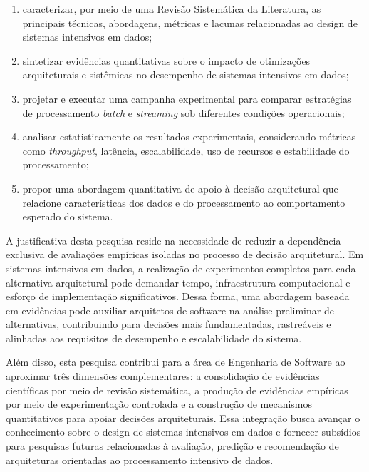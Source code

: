 \begin{enumerate}
\item caracterizar, por meio de uma Revisão Sistemática da Literatura, as principais técnicas, abordagens, métricas e lacunas relacionadas ao design de sistemas intensivos em dados;


\item sintetizar evidências quantitativas sobre o impacto de otimizações arquiteturais e sistêmicas no desempenho de sistemas intensivos em dados;

\item projetar e executar uma campanha experimental para comparar estratégias de processamento \textit{batch} e \textit{streaming} sob diferentes condições operacionais;

\item analisar estatisticamente os resultados experimentais, considerando métricas como \textit{throughput}, latência, escalabilidade, uso de recursos e estabilidade do processamento;

\item propor uma abordagem quantitativa de apoio à decisão arquitetural que relacione características dos dados e do processamento ao comportamento esperado do sistema.


\end{enumerate}

A justificativa desta pesquisa reside na necessidade de reduzir a dependência exclusiva de avaliações empíricas isoladas no processo de decisão arquitetural. Em sistemas intensivos em dados, a realização de experimentos completos para cada alternativa arquitetural pode demandar tempo, infraestrutura computacional e esforço de implementação significativos. Dessa forma, uma abordagem baseada em evidências pode auxiliar arquitetos de software na análise preliminar de alternativas, contribuindo para decisões mais fundamentadas, rastreáveis e alinhadas aos requisitos de desempenho e escalabilidade do sistema.

Além disso, esta pesquisa contribui para a área de Engenharia de Software ao aproximar três dimensões complementares: a consolidação de evidências científicas por meio de revisão sistemática, a produção de evidências empíricas por meio de experimentação controlada e a construção de mecanismos quantitativos para apoiar decisões arquiteturais. Essa integração busca avançar o conhecimento sobre o design de sistemas intensivos em dados e fornecer subsídios para pesquisas futuras relacionadas à avaliação, predição e recomendação de arquiteturas orientadas ao processamento intensivo de dados.


